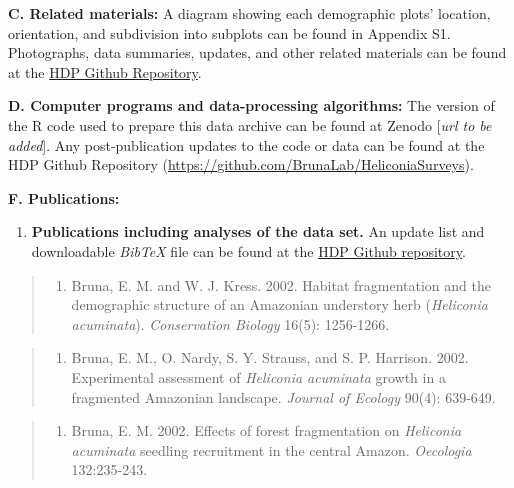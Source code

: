 \documentclass[
  12pt,
  man, donotrepeattitle,floatsintext]{apa6}
\providecommand{\tightlist}{%
  \setlength{\itemsep}{0pt}\setlength{\parskip}{0pt}}
\begin{document}
\noindent
\textbf{C. Related materials:} A diagram showing each demographic plots' location, orientation, and subdivision into subplots can be found in Appendix S1. Photographs, data summaries, updates, and other related materials can be found at the \href{https://github.com/BrunaLab/HeliconiaSurveys}{HDP Github Repository}.

\noindent
\textbf{D. Computer programs and data-processing algorithms:} The version of the R code used to prepare this data archive can be found at Zenodo {[}\emph{url to be added}{]}. Any post-publication updates to the code or data can be found at the HDP Github Repository (\url{https://github.com/BrunaLab/HeliconiaSurveys}).

\noindent
\textbf{F. Publications:}

\begin{enumerate}
\def\labelenumi{\arabic{enumi}.}
\tightlist
\item
  \textbf{Publications including analyses of the data set.} An update list and downloadable \emph{BibTeX} file can be found at the \href{https://github.com/BrunaLab/HeliconiaSurveys}{HDP Github repository}.
\end{enumerate}

\begin{quote}
\begin{enumerate}
\def\labelenumi{\arabic{enumi}.}
\tightlist
\item
  Bruna, E. M. and W. J. Kress. 2002. Habitat fragmentation and the demographic structure of an Amazonian understory herb (\emph{Heliconia acuminata}). \emph{Conservation Biology} 16(5): 1256-1266.
\end{enumerate}
\end{quote}

\begin{quote}
\begin{enumerate}
\def\labelenumi{\arabic{enumi}.}
\setcounter{enumi}{1}
\tightlist
\item
  Bruna, E. M., O. Nardy, S. Y. Strauss, and S. P. Harrison. 2002. Experimental assessment of \emph{Heliconia acuminata} growth in a fragmented Amazonian landscape. \emph{Journal of Ecology} 90(4): 639-649.
\end{enumerate}
\end{quote}

\begin{quote}
\begin{enumerate}
\def\labelenumi{\arabic{enumi}.}
\setcounter{enumi}{2}
\tightlist
\item
  Bruna, E. M. 2002. Effects of forest fragmentation on \emph{Heliconia acuminata} seedling recruitment in the central Amazon. \emph{Oecologia} 132:235-243.
\end{enumerate}
\end{quote}
\end{document}
